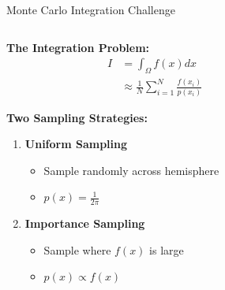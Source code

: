\documentclass[aspectratio=169]{beamer}
\begin{document}
\begin{frame}{Monte Carlo Integration Challenge}
    \begin{columns}
        \begin{column}{0.6\textwidth}
            \textbf{The Integration Problem:}
            \begin{align}
                I &= \int_{\Omega} f(x) dx \\
                &\approx \frac{1}{N} \sum_{i=1}^{N} \frac{f(x_i)}{p(x_i)}
            \end{align}
            
            \textbf{Two Sampling Strategies:}
            \begin{enumerate}
                \item<1-> \textbf{Uniform Sampling}
                \begin{itemize}
                    \item Sample randomly across hemisphere
                    \item $p(x) = \frac{1}{2\pi}$
                \end{itemize}
                \item<2-> \textbf{Importance Sampling}
                \begin{itemize}
                    \item Sample where $f(x)$ is large
                    \item $p(x) \propto f(x)$
                \end{itemize}
            \end{enumerate}
        \end{column}
        \begin{column}{0.4\textwidth}
        \end{column}
    \end{columns}
\end{frame}
\end{document}
